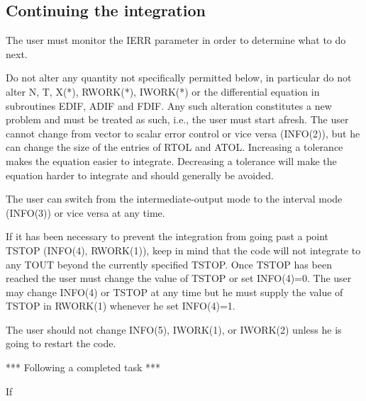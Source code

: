 \subsection{Continuing the integration}
The user must monitor the IERR parameter in order to determine what
to do next.

Do not alter any quantity not specifically permitted below, in
particular do not alter N, T, X(*), RWORK(*), IWORK(*) or the
differential equation in subroutines EDIF, ADIF and FDIF. Any such
alteration constitutes a new problem and must be treated as such,
i.e., the user must start afresh.
The user cannot change from vector to scalar error control or vice versa
(INFO(2)), but he can change the size of the entries of RTOL and
ATOL. Increasing a tolerance makes the equation easier to
integrate. Decreasing a tolerance will make the equation harder to
integrate and should generally be avoided.

The user can switch from the
intermediate-output mode to the interval mode (INFO(3)) or vice versa
at any time.

If it has been necessary to prevent the integration from going past a
point TSTOP (INFO(4), RWORK(1)), keep in mind that the code will not
integrate to any TOUT beyond the currently specified TSTOP. Once TSTOP
has been reached the user must change the value of TSTOP or set
INFO(4)=0. The user may change INFO(4) or TSTOP at any time but he must
supply the value of TSTOP in RWORK(1) whenever he set INFO(4)=1.

The user should not change INFO(5), IWORK(1), or IWORK(2) unless he is
going to restart the code.

\begin{center}
  *** Following a completed task ***
\end{center}
\noindent
If

